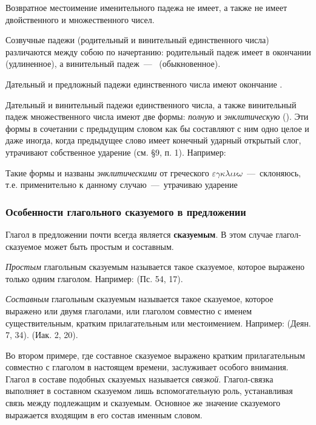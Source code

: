 \documentclass[11pt,a4paper,oneside]{memoir}
\begin{document}
    Возвратное местоимение {} именительного падежа не имеет, а также не имеет двойственного и множественного чисел.
    
    Созвучные падежи (родительный и винительный единственного числа) различаются между собою по начертанию: родительный падеж имеет в окончании {} (удлиненное), а винительный падеж~---~{} (обыкновенное).
    
    Дательный и предложный падежи единственного числа имеют окончание {}.
    
    Дательный и винительный падежи единственного числа, а также винительный падеж множественного числа имеют две формы: \emph{полную} и \emph{энклитическую} ({}). Эти формы в сочетании с предыдущим словом как бы составляют с ним одно целое и даже иногда, когда предыдущее слово имеет конечный ударный открытый слог, утрачивают собственное ударение (см. \S9, п. 1). Например: {}
    
    Такие формы и названы \emph{энклитическими} от греческого {$\varepsilon\gamma\kappa\lambda\iota\nu\omega$}~---~склоняюсь, т.е. применительно к данному случаю~---~утрачиваю ударение

                \subsubsection{Особенности глагольного сказуемого в предложении}

    Глагол в предложении почти всегда является \textbf{сказуемым}. В этом случае глагол-сказуемое может быть простым и составным.
    
    \emph{Простым} глагольным сказуемым называется такое сказуемое, которое выражено только одним глаголом. Например: {} (Пс. 54, 17).
    
    \emph{Составным} глагольным сказуемым называется такое сказуемое, которое выражено или двумя глаголами, или глаголом совместно с именем существительным, кратким прилагательным или местоимением. Например: {} (Деян. 7, 34). {} (Иак. 2, 20).
    
    Во втором примере, где составное сказуемое выражено кратким прилагательным совместно с глаголом {} в настоящем времени, заслуживает особого внимания. Глагол {} в составе подобных сказуемых называется \emph{связкой}. Глагол-связка выполняет в составном сказуемом лишь вспомогательную роль, устанавливая связь между подлежащим и сказуемым. Основное же значение сказуемого выражается входящим в его состав именным словом.
    
\end{document}

